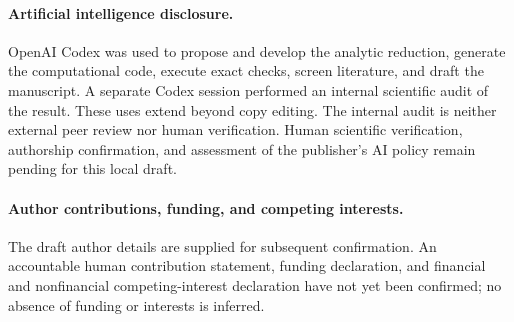 \documentclass[11pt,a4paper]{article}
\begin{document}
\paragraph{Artificial intelligence disclosure.}
OpenAI Codex was used to propose and develop the analytic reduction,
generate the computational code, execute exact checks, screen literature,
and draft the manuscript. A separate Codex session performed an internal
scientific audit of the result. These uses extend beyond copy editing.
The internal audit is neither external peer review nor human verification.
Human scientific verification, authorship confirmation, and assessment
of the publisher's AI policy remain pending for this local draft.

\paragraph{Author contributions, funding, and competing interests.}
The draft author details are supplied for subsequent confirmation.
An accountable human contribution statement, funding declaration, and
financial and nonfinancial competing-interest declaration have not yet
been confirmed; no absence of funding or interests is inferred.

\clearpage


\end{document}
